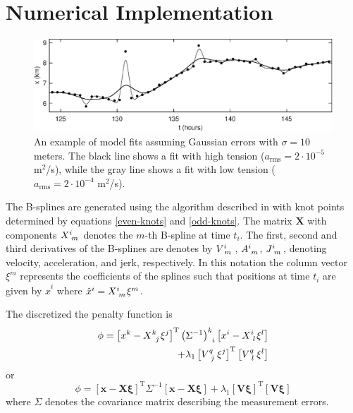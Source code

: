 \documentclass[twocol]{ametsoc}
\begin{document}
%
\section{Numerical Implementation}
%

\begin{figure}[t]
  \centerline{\includegraphics[width=39pc,angle=0]{gaussianfit}}
  
  \caption{An example of model fits assuming Gaussian errors with $\sigma=10$ meters. The black line shows a fit with high tension ($a_{\textrm{rms}}=2 \cdot 10^{-5}$ m$^2$/s), while the gray line shows a fit with  low tension ($a_{\textrm{rms}}=2 \cdot 10^{-4}$ m$^2$/s).}
  \label{gaussianfit}
\end{figure}


The B-splines are generated using the algorithm described in \citet{deboor1978-book} with knot points determined by equations \ref{even-knots} and \ref{odd-knots}. The matrix $\mathbf{X}$ with components $X\indices{^i_m}$ denotes the $m$-th B-spline at time $t_i$. The first, second and third derivatives of the B-splines are denotes by $V\indices{^i_m}$, $A\indices{^i_m}$, $J\indices{^i_m}$, denoting velocity, acceleration, and jerk, respectively. In this notation the column vector $\xi^m$ represents the coefficients of the splines such that positions at time $t_i$ are given by $\hat{x}^i$ where $\hat{x}^i =  X\indices{^i_m} \xi^m$.

The discretized the penalty function is
\begin{equation}
\begin{split}
\phi = \left[ x^k - X\indices{^k_j} \xi^j \right]^{\textrm{T}} \left(\Sigma^{-1}\right)\indices{^k_i} \left[ x^i - X\indices{^i_l} \xi^l \right] \\
+ \lambda_1 \left[V\indices{^q_j} \xi^j \right]^{\textrm{T}} \left[ V\indices{^q_l} \xi^l \right]
\end{split}
\end{equation}
or
\begin{equation}
\phi = \left[ \mathbf{x} - \mathbf{X} \mathbf{\xi} \right]^{\textrm{T}} \Sigma^{-1} \left[ \mathbf{x} - \mathbf{X} \mathbf{\xi}\right]
+ \lambda_1 \left[\mathbf{V}\mathbf{\xi} \right]^{\textrm{T}} \left[ \mathbf{V}\mathbf{\xi} \right]
\end{equation}
where $\Sigma$ denotes the covariance matrix describing the measurement errors.
\end{document}
